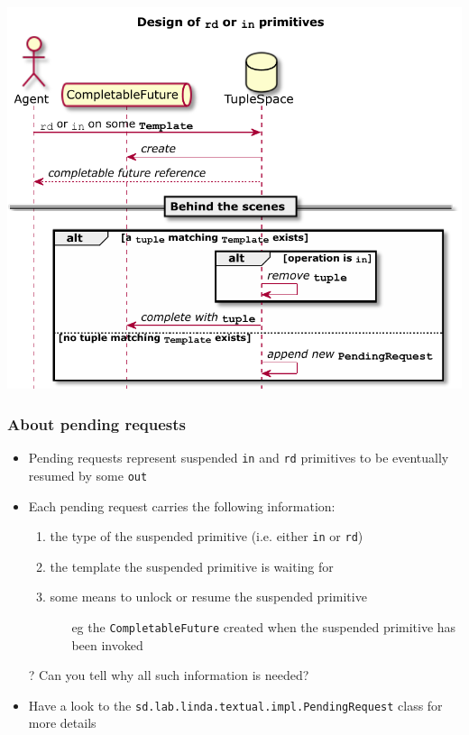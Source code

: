 \documentclass[presentation]{beamer}\mode<presentation>{\usetheme{AMSCesenaPurpleAndGold}}
\begin{document}
\begin{frame}

\begin{center}
	\includegraphics[width=.8\linewidth]{./img/rd-and-in-design.pdf}
\end{center}

\end{frame}

\begin{frame}
\frametitle{About pending requests}

\begin{itemize}
	\item Pending requests represent \alert{suspended} \texttt{in} and \texttt{rd} primitives to be eventually resumed by some \texttt{out}

	\vfill

	\item Each pending request carries the following information:
	\begin{enumerate}
		\item the \alert{type} of the suspended primitive (i.e. either \texttt{in} or \texttt{rd})
		\item the \alert{template} the suspended primitive is waiting for
		\item some means to \alert{unlock} or resume the suspended primitive
		\begin{itemize}
			\item[eg] the \texttt{\alert{CompletableFuture}} created when the suspended primitive has been invoked
		\end{itemize}
	\end{enumerate}

	\vfill

	\item[?] Can you tell \alert{why} all such information is needed?

	\vfill

	\item Have a look to the \texttt{sd.lab.linda.textual.impl.\alert{PendingRequest}} class for more details
\end{itemize}

\end{frame}
\end{document}
